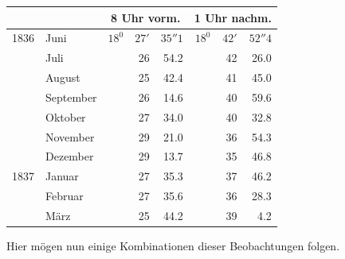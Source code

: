 \begin{center}\small
\begin{tabular}{rl|rrr|rrr}
&&\multicolumn{3}{c|}{8 Uhr vorm.}&\multicolumn{3}{c}{1 Uhr nachm.}\\\hline
1836&Juni&$18^0$&$27'$&$35''1$&$18^0$&$42'$&$52''4$\\
&Juli&&26&54.2&&42&26.0\\
&August&&25&42.4&&41&45.0\\
&September&&26&14.6&&40&59.6\\
&Oktober&&27&34.0&&40&32.8\\
&November&&29&21.0&&36&54.3\\
&Dezember&&29&13.7&&35&46.8\\[4pt]
1837&Januar&&27&35.3&&37&46.2\\
&Februar&&27&35.6&&36&28.3\\
&März&&25&44.2&&39&4.2
\end{tabular}
\end{center}

Hier mögen nun einige Kombinationen dieser Beobachtungen folgen.

